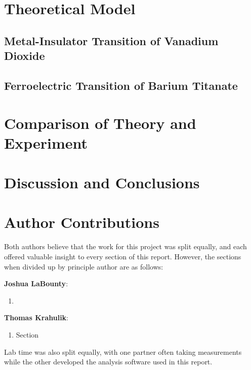 \documentclass[%
 reprint,
 amsmath,amssymb,
 aps,
 pra,
]{revtex4-1}
\begin{document}
\section{Theoretical Model}

\subsection{Metal-Insulator Transition of Vanadium Dioxide}

\subsection{Ferroelectric Transition of Barium Titanate}

\section{Comparison of Theory and Experiment}

\section{Discussion and Conclusions}

\section{Author Contributions}

Both authors believe that the work for this project was split equally, and each offered valuable insight to every section of this report. However, the sections when divided up by principle author are as follows:

\noindent \textbf{Joshua LaBounty}:
\begin{enumerate}
	\item 
\end{enumerate}

\noindent \textbf{Thomas Krahulik}:
\begin{enumerate}
	\item Section 
\end{enumerate}

\noindent Lab time was also split equally, with one partner often taking measurements while the other developed the analysis software used in this report.
\end{document}

